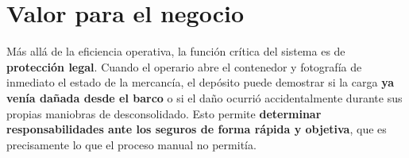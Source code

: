 \section{Valor para el negocio}
\label{sec:valor}

Más allá de la eficiencia operativa, la función crítica del sistema es de \textbf{protección
legal}. Cuando el operario abre el contenedor y fotografía de inmediato el estado de la mercancía,
el depósito puede demostrar si la carga \textbf{ya venía dañada desde el barco} o si el daño
ocurrió accidentalmente durante sus propias maniobras de desconsolidado. Esto permite
\textbf{determinar responsabilidades ante los seguros de forma rápida y objetiva}, que es
precisamente lo que el proceso manual no permitía.
